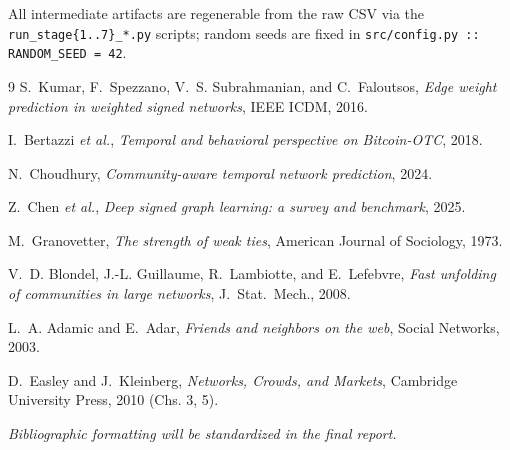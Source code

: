 \documentclass[11pt,a4paper]{article}
\newcommand{\code}[1]{\texttt{#1}}
\begin{document}
All intermediate artifacts are regenerable from the raw CSV via the
\code{run\_stage\{1..7\}\_*.py} scripts; random seeds are fixed in
\code{src/config.py :: RANDOM\_SEED = 42}.

\begin{thebibliography}{9}
S.~Kumar, F.~Spezzano, V.~S. Subrahmanian, and C.~Faloutsos,
\emph{Edge weight prediction in weighted signed networks},
IEEE ICDM, 2016.

I.~Bertazzi \textit{et al.},
\emph{Temporal and behavioral perspective on Bitcoin-OTC}, 2018.

N.~Choudhury,
\emph{Community-aware temporal network prediction}, 2024.

Z.~Chen \textit{et al.},
\emph{Deep signed graph learning: a survey and benchmark}, 2025.

M.~Granovetter,
\emph{The strength of weak ties},
American Journal of Sociology, 1973.

V.~D. Blondel, J.-L. Guillaume, R.~Lambiotte, and E.~Lefebvre,
\emph{Fast unfolding of communities in large networks},
J.\ Stat.\ Mech., 2008.

L.~A. Adamic and E.~Adar,
\emph{Friends and neighbors on the web},
Social Networks, 2003.

D.~Easley and J.~Kleinberg,
\emph{Networks, Crowds, and Markets},
Cambridge University Press, 2010 (Chs. 3, 5).
\end{thebibliography}

\textit{Bibliographic formatting will be standardized in the final report.}
\end{document}
